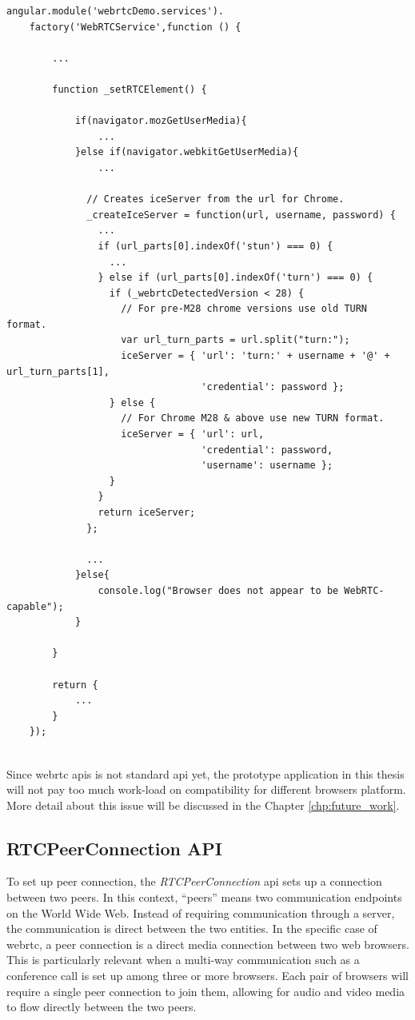 \begin{lstlisting}[caption={WebRTCService.js in application client},label={code:webrtc_service}]
angular.module('webrtcDemo.services').
	factory('WebRTCService',function () {
		
		...

		function _setRTCElement() {

			if(navigator.mozGetUserMedia){
				...
			}else if(navigator.webkitGetUserMedia){
				...

			  // Creates iceServer from the url for Chrome.
			  _createIceServer = function(url, username, password) {
			    ...
			    if (url_parts[0].indexOf('stun') === 0) {
			      ...
			    } else if (url_parts[0].indexOf('turn') === 0) {
			      if (_webrtcDetectedVersion < 28) {
			        // For pre-M28 chrome versions use old TURN format.
			        var url_turn_parts = url.split("turn:");
			        iceServer = { 'url': 'turn:' + username + '@' + url_turn_parts[1],
			                      'credential': password };
			      } else {
			        // For Chrome M28 & above use new TURN format.
			        iceServer = { 'url': url,
			                      'credential': password,
			                      'username': username };
			      }
			    }
			    return iceServer;
			  };

			  ...
			}else{
				console.log("Browser does not appear to be WebRTC-capable");
			}

		}

		return {
			...
		}
	});	
	
\end{lstlisting}

\par Since \gls{webrtc} \gls{api}s is not standard \gls{api} yet, the prototype application in this thesis will not pay too much work-load on compatibility for different browsers platform. More detail about this issue will be discussed in the Chapter \ref{chp:future_work}.

\subsection{RTCPeerConnection API}

\noindent To set up peer connection, the \textit{RTCPeerConnection} \gls{api} sets up a connection between two peers. In this context, “peers” means two communication endpoints on the World Wide Web. Instead of requiring communication through a server, the communication is direct between the two entities. In the specific case of \gls{webrtc}, a peer connection is a direct media connection between two web browsers. This is particularly relevant when a multi-way communication such as a conference call is set up among three or more browsers. Each pair of browsers will require a single peer connection to join them, allowing for audio and video media to flow directly between the two peers. 

